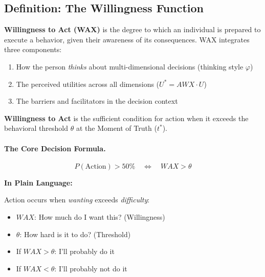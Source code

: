 \subsection{Definition: The Willingness Function}
\label{subsec:12-1-definition}

\begin{definition}
\label{def:willingness-content}
\textbf{Willingness to Act (WAX)} is the degree to which an individual is 
prepared to execute a behavior, given their awareness of its consequences. 
WAX integrates three components:
\begin{enumerate}
\item How the person \textit{thinks} about multi-dimensional decisions (thinking style $\varphi$)
\item The perceived utilities across all dimensions ($U^* = AWX \cdot U$)
\item The barriers and facilitators in the decision context
\end{enumerate}
\end{definition}

\begin{definition}
\label{def:willingness-function}
\textbf{Willingness to Act} is the sufficient condition for action when 
it exceeds the behavioral threshold $\theta$ at the Moment of Truth ($t^*$).
\end{definition}

\paragraph{The Core Decision Formula.}
\begin{equation}
\boxed{P(\text{Action}) > 50\% \quad \Leftrightarrow \quad WAX > \theta}
\label{eq:willingness-threshold}
\end{equation}

\begin{intuition}
\textbf{In Plain Language:}

Action occurs when \textit{wanting} exceeds \textit{difficulty}:
\begin{itemize}
\item $WAX$: How much do I want this? (Willingness)
\item $\theta$: How hard is it to do? (Threshold)
\item If $WAX > \theta$: I'll probably do it
\item If $WAX < \theta$: I'll probably not do it
\end{itemize}
\end{intuition}

